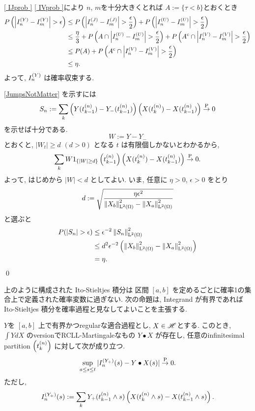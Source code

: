 \documentclass{ltjsarticle}
\begin{document}
\begin{prf}
	\eqref{ IJprob } \eqref{ IVprob }により
	\( n \), \( m \)を十分大きくとれば
	\( A := \{ \tau < b \} \)とおくとき
	\begin{align*}
		P \left(	\left| I_n^{ (Y) }-I_m^{ (Y) } \right| > \epsilon	\right)
		 & \le	P \left(	\left| I_n^{ (J) } - I_m^{ (J) } \right| > \frac{ \epsilon } { 2}	\right) + P \left(	\left| I_n^{ (U) } - I_m^{ (U) } \right| > \frac{ \epsilon }{ 2 }	\right)                                          \\
		 & \le	\frac{ \eta }{ 3 } + P \left(	A \cap \left| I_n^{ (U) } - I_m^{ (U) } \right| > \frac{ \epsilon }{ 2 } \right) + P \left(	A ^{\mathrm{c}} \cap \left| I_n^{ (V) } - I_m^{ (V) } \right| > \frac{ \epsilon }{ 2 }	\right) \\
		 & \le	P(A) + P \left(	A ^{\mathrm{c}} \cap \left| I_n^{(V)} - I_m^{(V)} \right| > \frac{ \epsilon }{ 2 }	\right)                                                                                           \\
		 & \le	\eta.
	\end{align*}
	よって, \( I_n^{ (Y) } \) は確率収束する.
	
	\eqref{JumpsNotMatter} を示すには
	\[
		S_n := \sum_k \left( Y(t_{k-1}^{(n)}) - Y_{-}(t_{k-1}^{(n)}) \right)
		\left( X(t_k^{(n)}) - X(t_{k-1}^{(n)}) \right) \stackrel{ \mathrm{P} }{ \to } 0
	\]
	を示せば十分である.
	\[
		W := Y-Y_{-}
	\]
	とおくと, \( | W_t | \ge d \) \( ( d > 0 ) \) となる \( t \) は有限個しかないとわかるから, 
	\[
		\sum_k W 1_{ \{ | W | \ge d \} } \left( t_{k-1}^{(n)} \right) \left( X(t_k^{(n)}) - X(t_{k-1}^{(n)}) \right) \stackrel{ \mathrm{P} }{ \to } 0.
	\]
	よって, はじめから \( | W | < d \) としてよい.
	いま, 任意に \( \eta > 0 \), \( \epsilon > 0 \) をとり
	\[
		d := \sqrt{ \frac{ \eta \epsilon^2 }{ \left\|  X_b  \right\|_{\mathrm{L}^2(\Omega)}^2 - \left\|  X_a  \right\|_{\mathrm{L}^2(\Omega)}^2 }}
	\]
	と選ぶと
	\begin{align*}
		P( | S_n | > \epsilon )
		 & \le	\epsilon^{ -2 } \left\|  S_n  \right\|_{\mathrm{L}^2(\Omega)}^2
		\\
		 & \le	d^2 \epsilon^{ -2 } \left( \left\|  X_b  \right\|_{\mathrm{L}^2(\Omega)}^2 - \left\|  X_a  \right\|_{\mathrm{L}^2(\Omega)}^2 \right) \\
		 & =	\eta.
	\end{align*}
	\qed\end{prf}

上のように構成された Ito-Stieltjes 積分は 区間 \( [a,b] \) を定めるごとに確率1の集合上で定義された確率変数に過ぎない. 次の命題は, Integrand が有界であれば Ito-Stieltjes 積分を確率過程と見なしてよいことを主張する.

\begin{prp}	%
	\( Y \)を \( [a,b] \) 上で有界かつregularな適合過程とし, \( X \in \mathscr{H} \)とする. このとき, 
	\( \int Y dX \) のversionでRCLL-Martingaleなもの \( Y \bullet X \) が存在し, 
	任意のinfinitesimal partition \( \left( t_k^{(n)} \right) \) に対して次が成り立つ.
	\[
		\sup_{ a \le s \le t } | I_n^{ ( Y_{+} ) }(s) - Y \bullet X(s) | \stackrel{ \mathrm{P} }{ \to } 0.
	\]
	ただし, 
	\[
		I_n^{ ( Y_{+} ) }(s) := \sum_k Y_{+}( t_{k-1}^{(n)} \wedge s )
		\left( X( t_k^{(n)} \wedge s )-X( t_{k-1}^{(n)} \wedge s ) \right).
	\]
\end{prp}
\end{document}
